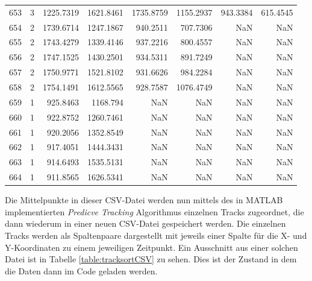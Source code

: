 \begin{table}[]
\begin{tabular}{@{}rcrrrrrr@{}}
    653     & 3    & 1225.7319 & 1621.8461 & 1735.8759 & 1155.2937 & 943.3384 & 615.4545 \\
    654     & 2    & 1739.6714 & 1247.1867 & 940.2511  & 707.7306  & NaN      & NaN      \\
    655     & 2    & 1743.4279 & 1339.4146 & 937.2216  & 800.4557  & NaN      & NaN      \\
    656     & 2    & 1747.1525 & 1430.2501 & 934.5311  & 891.7249  & NaN      & NaN      \\
    657     & 2    & 1750.9771 & 1521.8102 & 931.6626  & 984.2284  & NaN      & NaN      \\
    658     & 2    & 1754.1491 & 1612.5565 & 928.7587  & 1076.4749 & NaN      & NaN      \\
    659     & 1    & 925.8463  & 1168.794  & NaN       & NaN       & NaN      & NaN      \\
    660     & 1    & 922.8752  & 1260.7461 & NaN       & NaN       & NaN      & NaN      \\
    661     & 1    & 920.2056  & 1352.8549 & NaN       & NaN       & NaN      & NaN      \\
    662     & 1    & 917.4051  & 1444.3431 & NaN       & NaN       & NaN      & NaN      \\
    663     & 1    & 914.6493  & 1535.5131 & NaN       & NaN       & NaN      & NaN      \\
    664     & 1    & 911.8565  & 1626.5341 & NaN       & NaN       & NaN      & NaN      \\ \bottomrule
    \end{tabular}
    \normalsize
    
    \label{table:Segmentierungsscript}
    \end{table}
    

Die Mittelpunkte in dieser CSV-Datei werden nun mittels des in MATLAB implementierten \textit{Predicve Tracking} Algorithmus einzelnen Tracks zugeordnet,
die dann wiederum in einer neuen CSV-Datei gespeichert werden.
Die einzelnen Tracks werden als Spaltenpaare dargestellt mit jeweils einer Spalte für die X- und Y-Koordinaten zu einem jeweiligen Zeitpunkt.
Ein Ausschnitt aus einer solchen Datei ist in Tabelle \ref{table:tracksortCSV} zu sehen.
Dies ist der Zustand in dem die Daten dann im Code geladen werden. 


